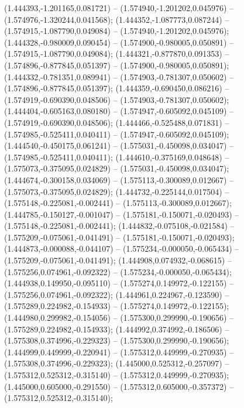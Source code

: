  (1.444393,-1.201165,0.081721) -- (1.574940,-1.201202,0.045976) -- (1.574976,-1.320244,0.041568);
 (1.444352,-1.087773,0.087244) -- (1.574915,-1.087790,0.049084) -- (1.574940,-1.201202,0.045976);
 (1.444328,-0.980009,0.090454) -- (1.574900,-0.980005,0.050891) -- (1.574915,-1.087790,0.049084);
 (1.444321,-0.877870,0.091353) -- (1.574896,-0.877845,0.051397) -- (1.574900,-0.980005,0.050891);
 (1.444332,-0.781351,0.089941) -- (1.574903,-0.781307,0.050602) -- (1.574896,-0.877845,0.051397);
 (1.444359,-0.690450,0.086216) -- (1.574919,-0.690390,0.048506) -- (1.574903,-0.781307,0.050602);
 (1.444404,-0.605163,0.080180) -- (1.574947,-0.605092,0.045109) -- (1.574919,-0.690390,0.048506);
 (1.444466,-0.525488,0.071831) -- (1.574985,-0.525411,0.040411) -- (1.574947,-0.605092,0.045109);
 (1.444540,-0.450175,0.061241) -- (1.575031,-0.450098,0.034047) -- (1.574985,-0.525411,0.040411);
 (1.444610,-0.375169,0.048648) -- (1.575073,-0.375095,0.024829) -- (1.575031,-0.450098,0.034047);
 (1.444674,-0.300158,0.034069) -- (1.575113,-0.300089,0.012667) -- (1.575073,-0.375095,0.024829);
 (1.444732,-0.225144,0.017504) -- (1.575148,-0.225081,-0.002441) -- (1.575113,-0.300089,0.012667);
 (1.444785,-0.150127,-0.001047) -- (1.575181,-0.150071,-0.020493) -- (1.575148,-0.225081,-0.002441);
 (1.444832,-0.075108,-0.021584) -- (1.575209,-0.075061,-0.041491) -- (1.575181,-0.150071,-0.020493);
 (1.444873,-0.000088,-0.044107) -- (1.575234,-0.000050,-0.065434) -- (1.575209,-0.075061,-0.041491);
 (1.444908,0.074932,-0.068615) -- (1.575256,0.074961,-0.092322) -- (1.575234,-0.000050,-0.065434);
 (1.444938,0.149950,-0.095110) -- (1.575274,0.149972,-0.122155) -- (1.575256,0.074961,-0.092322);
 (1.444961,0.224967,-0.123590) -- (1.575289,0.224982,-0.154933) -- (1.575274,0.149972,-0.122155);
 (1.444980,0.299982,-0.154056) -- (1.575300,0.299990,-0.190656) -- (1.575289,0.224982,-0.154933);
 (1.444992,0.374992,-0.186506) -- (1.575308,0.374996,-0.229323) -- (1.575300,0.299990,-0.190656);
 (1.444999,0.449999,-0.220941) -- (1.575312,0.449999,-0.270935) -- (1.575308,0.374996,-0.229323);
 (1.445000,0.525312,-0.257097) -- (1.575312,0.525312,-0.315140) -- (1.575312,0.449999,-0.270935);
 (1.445000,0.605000,-0.291550) -- (1.575312,0.605000,-0.357372) -- (1.575312,0.525312,-0.315140);
